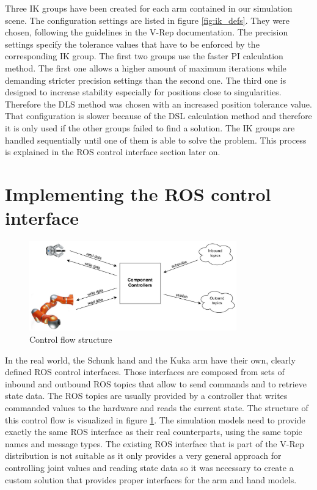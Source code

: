 Three IK groups have been created for each arm contained in our simulation scene. The configuration settings are listed in figure \ref{fig:ik_defs}. They were chosen, following the guidelines in the V-Rep documentation. The precision settings specify the tolerance values that have to be enforced by the corresponding IK group. The first two groups use the faster PI calculation method. The first one allows a higher amount of maximum iterations while demanding stricter precision settings than the second one. The third one is designed to increase stability especially for positions close to singularities. Therefore the DLS method was chosen with an increased position tolerance value. That configuration is slower because of the DSL calculation method and therefore it is only used if the other groups failed to find a solution. The IK groups are handled sequentially until one of them is able to solve the problem. This process is explained in the ROS control interface section later on.

\section{Implementing the ROS control interface}

\begin{figure}[htb]
	\centering
  	\includegraphics[width=0.8\textwidth]{images/control_flow.jpg}
	\caption{Control flow structure}
	\label{fig:control_flow}
\end{figure}

In the real world, the Schunk hand and the Kuka arm have their own, clearly defined ROS control interfaces. Those interfaces are composed from sets of inbound and outbound ROS topics that allow to send commands and to retrieve state data. The ROS topics are usually provided by a controller that writes commanded values to the hardware and reads the current state. The structure of this control flow is visualized in figure \ref{fig:control_flow}. The simulation models need to provide exactly the same ROS interface as their real counterparts, using the same topic names and message types. The existing ROS interface that is part of the V-Rep distribution is not suitable as it only provides a very general approach for controlling joint values and reading state data so it was necessary to create a custom solution that provides proper interfaces for the arm and hand models. \\

